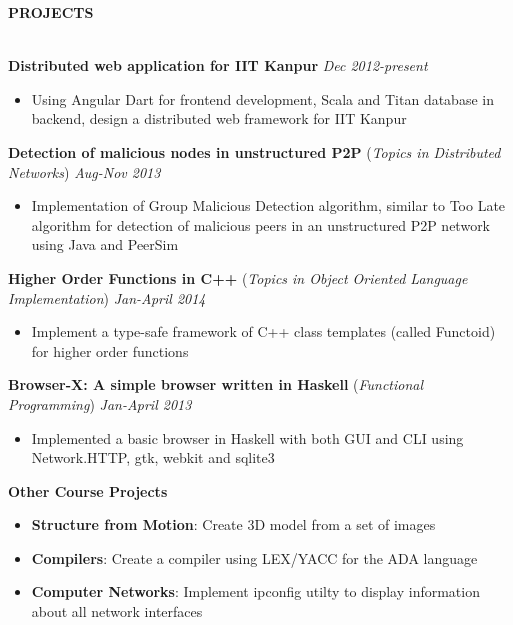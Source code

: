 \documentclass[10pt]{article}
\newcommand{\cvsectiontitle}[1]{
    		\colorbox{gray!40}{%
        \begin{minipage}{0.989\linewidth}%
            \vspace*{1pt}%
            \large\indent\textbf{#1}
            \vspace*{1pt}%
        \end{minipage}%
   		}\\[1mm]
		}
\begin{document}
\cvsectiontitle{PROJECTS}
\textbf{Distributed web application for IIT Kanpur} \hfill \textit{Dec 2012-present}
\vspace{-0.2cm}
\begin{itemize}
	\item Using Angular Dart for frontend development, Scala and Titan database in backend, design a distributed web framework for IIT Kanpur
\end{itemize}
\vspace{-0.1cm}
\textbf{Detection of malicious nodes in unstructured P2P} (\textit{Topics in Distributed Networks}) \hfill \textit{Aug-Nov 2013}
\vspace{-0.2cm}
\begin{itemize}
	\item Implementation of Group Malicious Detection algorithm, similar to Too Late algorithm for detection of malicious peers in an unstructured P2P network using Java and PeerSim
\end{itemize}
\vspace{-0.1cm}
\textbf{Higher Order Functions in C++} (\textit{Topics in Object Oriented Language Implementation}) \hfill \textit{Jan-April 2014}
\vspace{-0.2cm}
\begin{itemize}
	\item Implement a type-safe framework of C++ class templates (called Functoid) for higher order functions
\end{itemize}
\vspace{-0.1cm}
\textbf{Browser-X: A simple browser written in Haskell} (\textit{Functional Programming}) \hfill \textit{Jan-April 2013}
\vspace{-0.2cm}
\begin{itemize}
	\item Implemented a basic browser in Haskell with both GUI and CLI using Network.HTTP, gtk, webkit and sqlite3
\end{itemize}
\vspace{-0.1cm}
\textbf{Other Course Projects}
\vspace{-0.2cm}
\begin{itemize}
\setlength{\itemsep}{0.1mm}
\item \textbf{Structure from Motion}: Create 3D model from a set of images
\item \textbf{Compilers}: Create a compiler using LEX/YACC for the ADA language
\item \textbf{Computer Networks}: Implement ipconfig utilty to display information about all network interfaces
\end{itemize}
\end{document}

